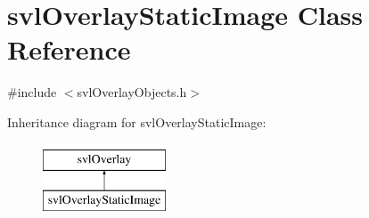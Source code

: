 \hypertarget{classsvl_overlay_static_image}{}\section{svl\+Overlay\+Static\+Image Class Reference}
\label{classsvl_overlay_static_image}


{\ttfamily \#include $<$svl\+Overlay\+Objects.\+h$>$}

Inheritance diagram for svl\+Overlay\+Static\+Image\+:\begin{figure}[H]
\begin{center}
\leavevmode
\includegraphics[height=2.000000cm]{d8/dd7/classsvl_overlay_static_image}
\end{center}
\end{figure}
